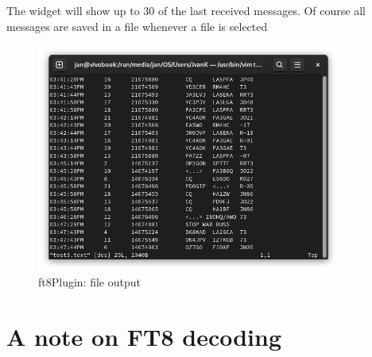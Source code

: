 \documentclass[11pt]{article}
\begin{document}
\par
The widget will show up to 30 of the last received messages. Of course
all messages are saved in a file whenever a file is selected

\begin{figure}[htp]
\centering
\includegraphics[width=100mm]{ft8-file.png}
\caption{ft8Plugin: file output}
\label{figure:ft8_file}
\end{figure}
\section{A note on FT8 decoding}
\end{document}

